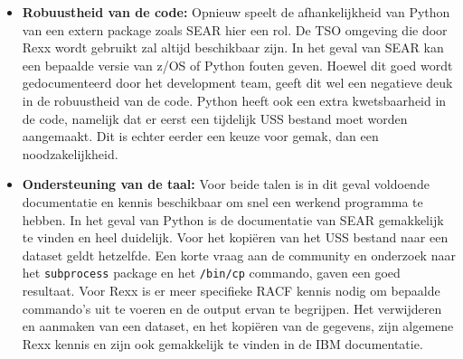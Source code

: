 \begin{itemize}
\item \textbf{Robuustheid van de code:}
Opnieuw speelt de afhankelijkheid van Python van een extern package zoals SEAR hier een rol. De TSO omgeving die door Rexx wordt gebruikt zal altijd beschikbaar zijn. In het geval van SEAR kan een bepaalde versie van z/OS of Python fouten geven. Hoewel dit goed wordt gedocumenteerd door het development team, geeft dit wel een negatieve deuk in de robuustheid van de code. Python heeft ook een extra kwetsbaarheid in de code, namelijk dat er eerst een tijdelijk USS bestand moet worden aangemaakt. Dit is echter eerder een keuze voor gemak, dan een noodzakelijkheid.
    
\item \textbf{Ondersteuning van de taal:}
Voor beide talen is in dit geval voldoende documentatie en kennis beschikbaar om snel een werkend programma te hebben. In het geval van Python is de documentatie van SEAR gemakkelijk te vinden en heel duidelijk. Voor het kopiëren van het USS bestand naar een dataset geldt hetzelfde. Een korte vraag aan de community en onderzoek naar het \texttt{subprocess} package en het \texttt{/bin/cp} commando, gaven een goed resultaat. Voor Rexx is er meer specifieke RACF kennis nodig om bepaalde commando's uit te voeren en de output ervan te begrijpen. Het verwijderen en aanmaken van een dataset, en het kopiëren van de gegevens, zijn algemene Rexx kennis en zijn ook gemakkelijk te vinden in de IBM documentatie.
\end{itemize}